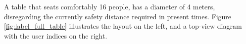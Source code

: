 A table that seats comfortably 16 people, has a diameter of 4 meters, disregarding the currently safety distance required in present times. Figure \ref{fig:label_full_table} illustrates the layout on the left, and a top-view diagram with the user indices on the right.








